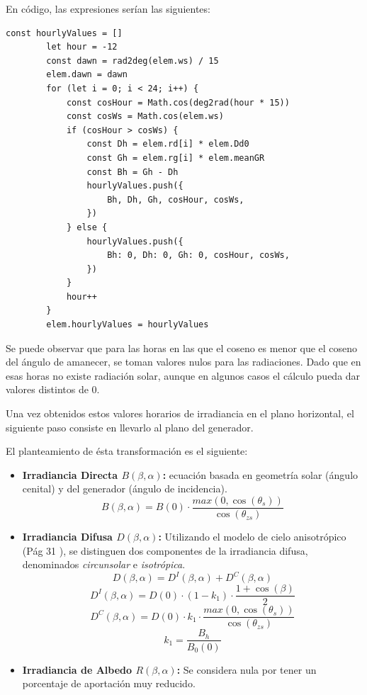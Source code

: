 En código, las expresiones serían las siguientes:

\begin{lstlisting}[style=ES6, caption={Cálculo de rG}]
		const hourlyValues = []
		let hour = -12
		const dawn = rad2deg(elem.ws) / 15
		elem.dawn = dawn
		for (let i = 0; i < 24; i++) {
			const cosHour = Math.cos(deg2rad(hour * 15))
			const cosWs = Math.cos(elem.ws)
			if (cosHour > cosWs) {
				const Dh = elem.rd[i] * elem.Dd0
				const Gh = elem.rg[i] * elem.meanGR
				const Bh = Gh - Dh
				hourlyValues.push({
					Bh, Dh, Gh, cosHour, cosWs,
				})
			} else {
				hourlyValues.push({
					Bh: 0, Dh: 0, Gh: 0, cosHour, cosWs,
				})
			}
			hour++
		}
		elem.hourlyValues = hourlyValues
\end{lstlisting}

Se puede observar que para las horas en las que el coseno es menor que el coseno del ángulo de amanecer, se toman valores nulos para las radiaciones. Dado que en esas horas no existe radiación solar, aunque en algunos casos el cálculo pueda dar valores distintos de 0.

Una vez obtenidos estos valores horarios de irradiancia en el plano horizontal, el siguiente paso consiste en llevarlo al plano del generador.

El planteamiento de ésta transformación es el siguiente:
\begin{itemize}
\item \textbf{Irradiancia Directa $B(\beta,\alpha)$:} ecuación basada en geometría solar (ángulo cenital) y del generador (ángulo de incidencia).
\begin{equation}
\label{eqn:B_beta_alpha}
B(\beta,\alpha) = B(0) \cdot \frac{max(0,\cos(\theta_s))}{\cos(\theta_{zs})}
\end{equation}
\item \textbf{Irradiancia Difusa $D(\beta,\alpha)$:} Utilizando el modelo de cielo anisotrópico (Pág 31 \cite{esf_book}), se distinguen dos componentes de la irradiancia difusa, denominados \textit{circunsolar} e \textit{isotrópica}.
\begin{equation}
D(\beta,\alpha) = D^I(\beta,\alpha)+D^C(\beta,\alpha)
\end{equation}
\begin{equation}
D^I(\beta,\alpha) = D(0)\cdot(1-k_1)\cdot\frac{1+\cos(\beta)}{2}
\end{equation}
\begin{equation}
D^C(\beta,\alpha) = D(0)\cdot k_1 \cdot \frac{max(0, \cos(\theta_s))}{\cos(\theta_{zs})}
\end{equation}
\begin{equation}
k_1 = \frac{B_h}{B_0(0)}
\end{equation}
\item \textbf{Irradiancia de Albedo $R(\beta,\alpha)$:} Se considera nula por tener un porcentaje de aportación muy reducido.
\end{itemize}

